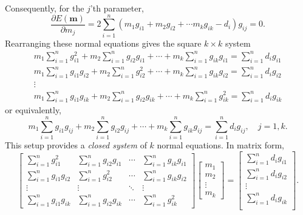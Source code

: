 Consequently, for the $j$'th parameter,
\begin{equation}
\frac{\partial E(\mathbf{m})}{\partial m_j} = 2 \displaystyle \sum ^n _{i=1}(m_1g_{i1} + m_2g_{i2} + \cdots m_k g_{ik} -d_i)g_{ij}= 0.
\end{equation}
Rearranging these normal equations gives the square $k \times k$ system
\begin{equation}
\begin{array}{c}
m_1 \displaystyle \sum ^n _{i=1} g^2_{i1} + m_2 \displaystyle \sum ^n _{i=1} g_{i2} g_{i1} + \cdots + m_k 
 \displaystyle \sum ^n _{i=1} g_{ik}g_{i1} =  \displaystyle \sum^n _{i=1} d_i g_{i1}\\
m_1 \displaystyle \sum ^n _{i=1} g_{i1}g_{i2} + m_2 \displaystyle \sum ^n _{i=1} g^2_{i2} + \cdots + m_k  \displaystyle \sum ^n _{i=1} g_{ik}g_{i2} =  \displaystyle \sum^n _{i=1} d_i g_{i2}\\
\vdots \\
m_1 \displaystyle \sum ^n _{i=1} g_{i1}g_{ik} + m_2 \displaystyle \sum ^n _{i=1} g_{i2} g_{ik} + \cdots + m_k 
 \displaystyle \sum ^n _{i=1} g^2_{ik} =  \displaystyle \sum^n _{i=1} d_i g_{ik}
\end{array}
\end{equation}
or equivalently,
\begin{equation}
m_1 \displaystyle \sum ^n _{i=1} g_{i1}g_{ij} + m_2 \displaystyle \sum ^n _{i=1} g_{i2} g_{ij} + \cdots + m_k 
 \displaystyle \sum ^n _{i=1} g_{ik}g_{ij} =  \displaystyle \sum^n _{i=1} d_i g_{ij}, \quad j=1,k.
\end{equation}
This setup provides a \emph{closed system} of $k$ normal equations.  In matrix form,
\begin{equation}
\left [  \begin{array}{cccc}
\displaystyle \sum ^n _{i=1} g^2_{i1} & \displaystyle \sum ^n _{i=1} g_{i2}g_{i1} & \cdots &
\displaystyle \sum ^n _{i=1} g_{ik}g_{i1} \\
\displaystyle \sum ^n _{i=1} g_{i1}g_{i2} &  \displaystyle \sum ^n _{i=1} g^2_{i2} & \cdots &
\displaystyle \sum^n _{i=1} g_{ik}g_{i2} \\
\vdots & \vdots & \ddots & \vdots\\
\displaystyle \sum ^n _{i=1} g_{i1}g_{ik} &  \displaystyle \sum ^n _{i=1} g_{i2}g_{ik} & \cdots & \displaystyle \sum ^n _{i=1} g^2_{ik} 
\end{array}   \right ]	\left[ \begin{array}{c} m_1 \\ m_2 \\ \vdots \\ m_k     \end{array}  \right ]  = \left[  \begin{array}{c}\displaystyle \sum ^n _{i=1} d_{i}g_{i1}\\
\displaystyle \sum ^n _{i=1} d_{i}g_{i2}\\
\vdots \\
\displaystyle \sum ^n _{i=1} d_{i}g_{ik}\\
   \end{array} \right].
\label{eq:normalwsums}
\end{equation}
